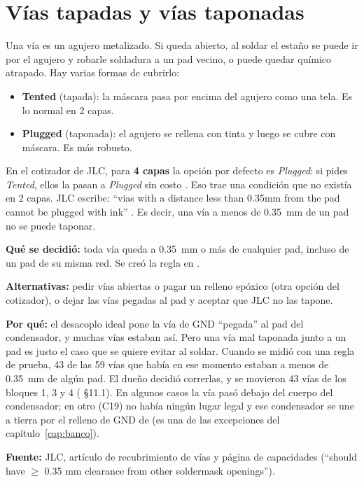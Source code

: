 \section{Vías tapadas y vías taponadas}\label{sec:c06-vias}

Una vía es un agujero metalizado. Si queda abierto, al soldar el estaño se puede ir por el agujero y robarle
soldadura a un pad vecino, o puede quedar químico atrapado. Hay varias formas de cubrirlo:
\begin{itemize}
  \item \textbf{Tented} (tapada): la máscara pasa por encima del agujero como una tela. Es lo normal en 2 capas.
  \item \textbf{Plugged} (taponada): el agujero se rellena con tinta y luego se cubre con máscara. Es más
        robusto.
\end{itemize}

En el cotizador de JLC, para \textbf{4 capas} la opción por defecto es \emph{Plugged}: si pides \emph{Tented},
ellos la pasan a \emph{Plugged} sin costo . Eso trae una condición que no existía en 2 capas.
JLC escribe: ``vias with a distance less than 0.35mm from the pad cannot be plugged with ink''
. Es decir, una vía a menos de \SI{0.35}{\milli\meter} de un pad no se
puede taponar.

\begin{decision}
\textbf{Qué se decidió:} toda vía queda a \SI{0.35}{\milli\meter} o más de cualquier pad, incluso de un pad de su
misma red. Se creó la regla  en .

\textbf{Alternativas:} pedir vías abiertas o pagar un relleno epóxico (otra opción del cotizador), o dejar las vías
pegadas al pad y aceptar que JLC no las tapone.

\textbf{Por qué:} el desacoplo ideal pone la vía de GND ``pegada'' al pad del condensador, y muchas vías estaban
así. Pero una vía mal taponada junto a un pad es justo el caso que se quiere evitar al soldar. Cuando se midió con
una regla de prueba, 43 de las 59 vías que había en ese momento estaban a menos de \SI{0.35}{\milli\meter} de algún
pad. El dueño decidió correrlas, y se movieron 43 vías de los bloques 1, 3 y 4 ( §11.1). En
algunos casos la vía pasó debajo del cuerpo del condensador; en otro (C19) no había ningún lugar legal y ese
condensador se une a tierra por el relleno de GND de  (es una de las excepciones del
capítulo~\ref{cap:banco}).

\textbf{Fuente:} JLC, artículo de recubrimiento de vías y página de capacidades (``should have $\geq$ 0.35 mm
clearance from other soldermask openings'').
\end{decision}

